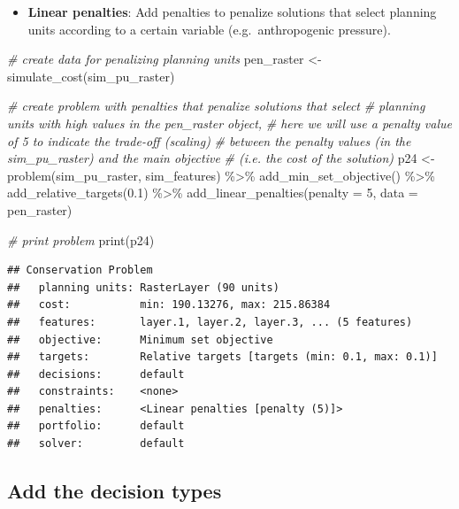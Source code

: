 \documentclass[
  12pt,
]{book}
\newenvironment{Shaded}{\begin{snugshade}}{\end{snugshade}}
\newcommand{\AttributeTok}[1]{\textcolor[rgb]{0.77,0.63,0.00}{#1}}
\newcommand{\CommentTok}[1]{\textcolor[rgb]{0.56,0.35,0.01}{\textit{#1}}}
\newcommand{\DecValTok}[1]{\textcolor[rgb]{0.00,0.00,0.81}{#1}}
\newcommand{\FloatTok}[1]{\textcolor[rgb]{0.00,0.00,0.81}{#1}}
\newcommand{\FunctionTok}[1]{\textcolor[rgb]{0.00,0.00,0.00}{#1}}
\newcommand{\NormalTok}[1]{#1}
\newcommand{\OtherTok}[1]{\textcolor[rgb]{0.56,0.35,0.01}{#1}}
\newcommand{\SpecialCharTok}[1]{\textcolor[rgb]{0.00,0.00,0.00}{#1}}
\providecommand{\tightlist}{%
  \setlength{\itemsep}{0pt}\setlength{\parskip}{0pt}}
\begin{document}
\begin{itemize}
\tightlist
\item
  \textbf{Linear penalties}: Add penalties to penalize solutions that select planning units according to a certain variable (e.g.~anthropogenic pressure).
\end{itemize}

\begin{Shaded}
\begin{Highlighting}[]
\CommentTok{\# create data for penalizing planning units}
\NormalTok{pen\_raster }\OtherTok{\textless{}{-}} \FunctionTok{simulate\_cost}\NormalTok{(sim\_pu\_raster)}

\CommentTok{\# create problem with penalties that penalize solutions that select}
\CommentTok{\# planning units with high values in the pen\_raster object,}
\CommentTok{\# here we will use a penalty value of 5 to indicate the trade{-}off (scaling)}
\CommentTok{\# between the penalty values (in the sim\_pu\_raster) and the main objective}
\CommentTok{\# (i.e. the cost of the solution)}
\NormalTok{p24 }\OtherTok{\textless{}{-}} \FunctionTok{problem}\NormalTok{(sim\_pu\_raster, sim\_features) }\SpecialCharTok{\%\textgreater{}\%}
       \FunctionTok{add\_min\_set\_objective}\NormalTok{() }\SpecialCharTok{\%\textgreater{}\%}
       \FunctionTok{add\_relative\_targets}\NormalTok{(}\FloatTok{0.1}\NormalTok{) }\SpecialCharTok{\%\textgreater{}\%}
       \FunctionTok{add\_linear\_penalties}\NormalTok{(}\AttributeTok{penalty =} \DecValTok{5}\NormalTok{, }\AttributeTok{data =}\NormalTok{ pen\_raster)}

\CommentTok{\# print problem}
\FunctionTok{print}\NormalTok{(p24)}
\end{Highlighting}
\end{Shaded}

\begin{verbatim}
## Conservation Problem
##   planning units: RasterLayer (90 units)
##   cost:           min: 190.13276, max: 215.86384
##   features:       layer.1, layer.2, layer.3, ... (5 features)
##   objective:      Minimum set objective 
##   targets:        Relative targets [targets (min: 0.1, max: 0.1)]
##   decisions:      default
##   constraints:    <none>
##   penalties:      <Linear penalties [penalty (5)]>
##   portfolio:      default
##   solver:         default
\end{verbatim}

\hypertarget{add-the-decision-types}{%
\subsection{Add the decision types}\label{add-the-decision-types}}
\end{document}
